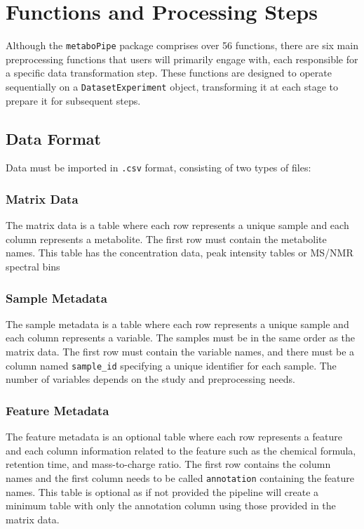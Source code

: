 \documentclass[ENG, BIB]{TFUOC}%
\begin{document}
\section{Functions and Processing Steps}
Although the \texttt{metaboPipe} package comprises over 56 functions, there are six main preprocessing functions that users will primarily engage with, each responsible for a specific data transformation step. These functions are designed to operate sequentially on a \texttt{DatasetExperiment} object, transforming it at each stage to prepare it for subsequent steps.

\subsection{Data Format}
Data must be imported in \texttt{.csv} format, consisting of two types of files:

\subsubsection{Matrix Data}
The matrix data is a table where each row represents a unique sample and each column represents a metabolite. The first row must contain the metabolite names. This table has the concentration data, peak intensity tables or MS/NMR spectral bins

\subsubsection{Sample Metadata}
The sample metadata is a table where each row represents a unique sample and each column represents a variable. The samples must be in the same order as the matrix data. The first row must contain the variable names, and there must be a column named \texttt{sample\_id} specifying a unique identifier for each sample. The number of variables depends on the study and preprocessing needs.

\subsubsection{Feature Metadata}
The feature metadata is an optional table where each row represents a feature and each column information related to the feature such as the chemical formula, retention time, and mass-to-charge ratio. The first row contains the column names and the first column needs to be called \texttt{annotation} containing the feature names. This table is optional as if not provided the pipeline will create a minimum table with only the annotation column using those provided in the matrix data.
\end{document}
